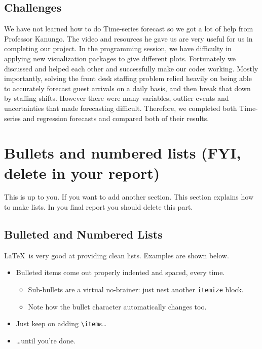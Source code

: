 \documentclass{article}
\begin{document}
\subsection{Challenges}

We have not learned how to do Time-series forecast so we got a lot of help from Professor Kanungo. The video and resources he gave us are very useful for us in completing our project. In the programming session, we have difficulty in applying new visualization packages to give different plots. Fortunately we discussed and helped each other and successfully make our codes working. Mostly importantly, solving the front desk staffing problem relied heavily on being able to accurately forecast guest arrivals on a daily basis, and then break that down by staffing shifts. However there were many variables, outlier events and uncertainties that made forecasting difficult. Therefore, we completed both Time-series and regression forecasts and compared both of their results.

\section{Bullets and numbered lists (FYI, delete in your report)}

This is up to you. If you want to add another section. This section explains how to make lists. In you final report you should delete this part. 

\subsection{Bulleted and Numbered Lists}

\LaTeX\ is very good at providing clean lists.  Examples are shown below.

\begin{itemize}
\item Bulleted items come out properly indented and spaced, every time.

\begin{itemize}
\item Sub-bullets are a virtual no-brainer: just nest another \verb!itemize! block.
\item Note how the bullet character automatically changes too.
\end{itemize}

\item Just keep on adding \verb!\item!s\ldots

\item \ldots until you're done.
\end{itemize}
\end{document}
